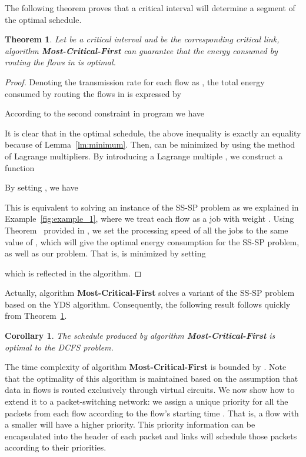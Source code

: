 \documentclass[10pt, conference, compsocconf]{IEEEtran}
\newtheorem{theorem}{Theorem}
\newtheorem{corollary}{Corollary}
\begin{document}
The following theorem proves that a critical interval will determine a segment of the optimal schedule.
\begin{theorem}
\label{thm:interval-opt}
Let  be a critical interval and  be the corresponding critical link, algorithm \textbf{Most-Critical-First} can guarantee that the energy consumed by routing the flows in  is optimal.
\end{theorem}
\begin{proof}
Denoting the transmission rate for each flow  as , the total energy consumed by routing the flows in  is expressed by

According to the second constraint in program  we have

It is clear that in the optimal schedule, the above inequality is exactly an equality because of Lemma~\ref{lm:minimum}. Then,  can be minimized by using the method of Lagrange multipliers. By introducing a Lagrange multiple , we construct a function

By setting , we have

This is equivalent to solving an instance of the SS-SP problem as we explained in Example~\ref{fig:example_1}, where we treat each flow as a job with weight . Using Theorem~ provided in \cite{Yao_Demers_Shenker-YDS-1995}, we set the processing speed of all the jobs to the same value of , which will give the optimal energy consumption for the SS-SP problem, as well as our problem. That is,  is minimized by setting

which is reflected in the algorithm.
\end{proof}
Actually, algorithm \textbf{Most-Critical-First} solves a variant of the SS-SP problem based on the YDS algorithm. Consequently, the following result follows quickly from Theorem~\ref{thm:interval-opt}.
\begin{corollary}
The schedule produced by algorithm \textbf{Most-Critical-First} is optimal to the DCFS problem.
\end{corollary}

The time complexity of algorithm \textbf{Most-Critical-First} is bounded by . Note that the optimality of this algorithm is maintained based on the assumption that data in flows is routed exclusively through virtual circuits. We now show how to extend it to a packet-switching network: we assign a unique priority for all the packets from each flow according to the flow's starting time . That is, a flow  with a smaller  will have a higher priority. This priority information can be encapsulated into the header of each packet and links will schedule those packets according to their priorities. 
\end{document}
